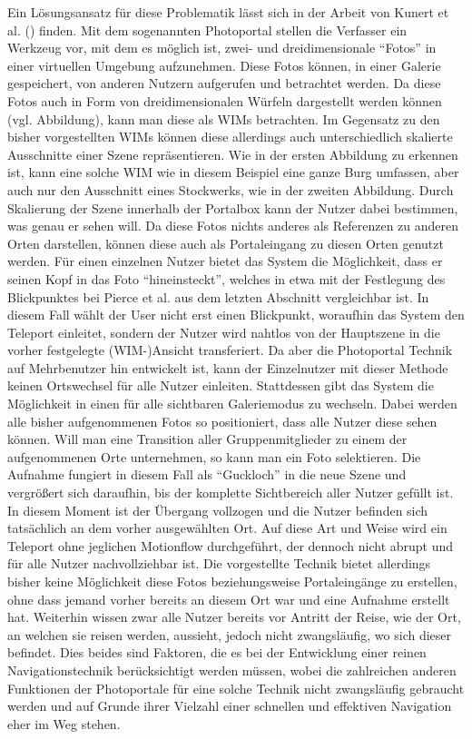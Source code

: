 Ein Lösungsansatz für diese Problematik lässt sich in der Arbeit von Kunert et al. (\cite{Kunert2014Photoportals}) finden.
Mit dem sogenannten Photoportal stellen die Verfasser ein Werkzeug vor, mit dem es möglich ist, zwei- und dreidimensionale “Fotos” in einer virtuellen Umgebung aufzunehmen.
Diese Fotos können, in einer Galerie gespeichert, von anderen Nutzern aufgerufen und betrachtet werden. Da diese Fotos auch in Form von dreidimensionalen Würfeln dargestellt werden können (vgl. Abbildung), kann man diese als WIMs betrachten.
Im Gegensatz zu den bisher vorgestellten WIMs können diese allerdings auch unterschiedlich skalierte Ausschnitte einer Szene repräsentieren. Wie in der ersten Abbildung zu erkennen ist, kann eine solche WIM wie in diesem Beispiel eine ganze Burg umfassen, aber auch nur den Ausschnitt eines Stockwerks, wie in der zweiten Abbildung. Durch Skalierung der Szene innerhalb der Portalbox kann der Nutzer dabei bestimmen, was genau er sehen will.
Da diese Fotos nichts anderes als Referenzen zu anderen Orten darstellen, können diese auch als Portaleingang zu diesen Orten genutzt werden.
Für einen einzelnen Nutzer bietet das System die Möglichkeit, dass er seinen Kopf in das Foto “hineinsteckt”, welches in etwa mit der Festlegung des Blickpunktes bei Pierce et al. aus dem letzten Abschnitt vergleichbar ist. In diesem Fall wählt der User nicht erst einen Blickpunkt, woraufhin das System den Teleport einleitet, sondern der Nutzer wird nahtlos von der Hauptszene in die vorher festgelegte (WIM-)Ansicht transferiert. Da aber die Photoportal Technik auf Mehrbenutzer hin entwickelt ist, kann der Einzelnutzer mit dieser Methode keinen Ortswechsel für alle Nutzer einleiten. Stattdessen gibt das System die Möglichkeit in einen für alle sichtbaren Galeriemodus zu wechseln. Dabei werden alle bisher aufgenommenen Fotos so positioniert, dass alle Nutzer diese sehen können. Will man eine Transition aller Gruppenmitglieder zu einem der aufgenommenen Orte unternehmen, so kann man ein Foto selektieren. Die Aufnahme fungiert in diesem Fall als “Guckloch” in die neue Szene und vergrößert sich daraufhin, bis der komplette Sichtbereich aller Nutzer gefüllt ist. In diesem Moment ist der Übergang vollzogen und die Nutzer befinden sich tatsächlich an dem vorher ausgewählten Ort. 
Auf diese Art und Weise wird ein Teleport ohne jeglichen Motionflow durchgeführt, der dennoch nicht abrupt und für alle Nutzer nachvollziehbar ist.
Die vorgestellte Technik bietet allerdings bisher keine Möglichkeit diese Fotos beziehungsweise Portaleingänge zu erstellen, ohne dass jemand vorher bereits an diesem Ort war und eine Aufnahme erstellt hat. Weiterhin wissen zwar alle Nutzer bereits vor Antritt der Reise, wie der Ort, an welchen sie reisen werden, aussieht, jedoch nicht zwangsläufig, wo sich dieser befindet.
Dies beides sind Faktoren, die es bei der Entwicklung einer reinen Navigationstechnik berücksichtigt werden müssen, wobei die zahlreichen anderen Funktionen der Photoportale für eine solche Technik nicht zwangsläufig gebraucht werden und auf Grunde ihrer Vielzahl einer schnellen und effektiven Navigation eher im Weg stehen.

